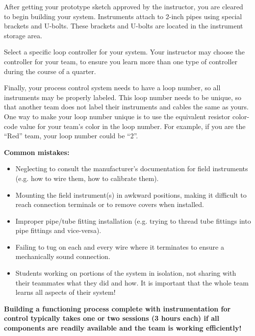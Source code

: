 \documentclass[12pt,a4paper]{book}
\begin{document}
After getting your prototype sketch approved by the instructor, you are cleared to begin building your system.  Instruments attach to 2-inch pipes using special brackets and U-bolts.  These brackets and U-bolts are located in the instrument storage area.  

Select a specific loop controller for your system.  Your instructor may choose the controller for your team, to ensure you learn more than one type of controller during the course of a quarter.

Finally, your process control system needs to have a loop number, so all instruments may be properly labeled.  This loop number needs to be unique, so that another team does not label their instruments and cables the same as yours.  One way to make your loop number unique is to use the equivalent resistor color-code value for your team's color in the loop number.  For example, if you are the ``Red'' team, your loop number could be ``2''. 

\vskip 10pt

{\bf Common mistakes:}

\begin{itemize}
\item{} Neglecting to consult the manufacturer's documentation for field instruments (e.g. how to wire them, how to calibrate them).
\item{} Mounting the field instrument(s) in awkward positions, making it difficult to reach connection terminals or to remove covers when installed.
\item{} Improper pipe/tube fitting installation (e.g. trying to thread tube fittings into pipe fittings and vice-versa).
\item{} Failing to tug on each and every wire where it terminates to ensure a mechanically sound connection.
\item{} Students working on portions of the system in isolation, not sharing with their teammates what they did and how.  It is important that the whole team learns all aspects of their system!
\end{itemize}

\vskip 10pt

{\bf Building a functioning process complete with instrumentation for control typically takes one or two sessions (3 hours each) if all components are readily available and the team is working efficiently!}





\vfil \eject
\end{document}
